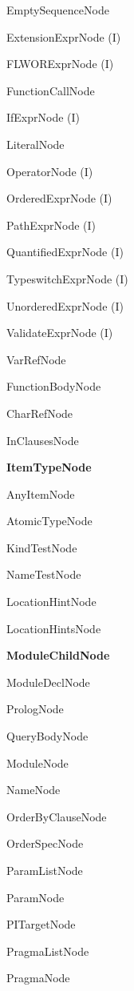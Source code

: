 \begin{description}
\begin{description}
\begin{description}
  \item EmptySequenceNode
  \item ExtensionExprNode (I)
  \item FLWORExprNode (I)
  \item FunctionCallNode
  \item IfExprNode (I)
  \item LiteralNode
  \item OperatorNode (I)
  \item OrderedExprNode (I)
  \item PathExprNode (I)
  \item QuantifiedExprNode (I)
  \item TypeswitchExprNode (I)
  \item UnorderedExprNode (I)
  \item ValidateExprNode (I)
  \item VarRefNode
  \end{description}
\item FunctionBodyNode
\item CharRefNode
\item InClausesNode
\item \textbf{ItemTypeNode}
  \begin{description}
  \item AnyItemNode
  \item AtomicTypeNode
  \item KindTestNode
  \item NameTestNode
  \end{description}
\item LocationHintNode
\item LocationHintsNode
\item \textbf{ModuleChildNode}
  \begin{description}
  \item ModuleDeclNode
  \item PrologNode
  \item QueryBodyNode
  \end{description}
\item ModuleNode
\item NameNode
\item OrderByClauseNode
\item OrderSpecNode
\item ParamListNode
\item ParamNode
\item PITargetNode
\item PragmaListNode
\item PragmaNode

\end{description}
\end{description}
